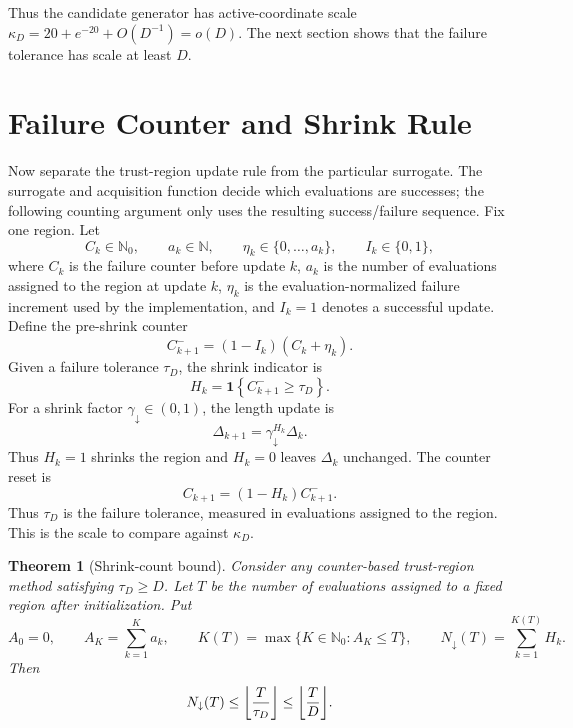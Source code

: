 \documentclass[10pt]{article}
\numberwithin{equation}{section}
\newcommand{\N}{\mathbb{N}}
\newcommand{\indic}[1]{\mathbf{1}\!\left\{#1\right\}}
\DeclarePairedDelimiter{\floor}{\lfloor}{\rfloor}
\theoremstyle{plain}
\newtheorem{theorem}{Theorem}
\theoremstyle{definition}
\theoremstyle{remark}
\begin{document}
Thus the candidate generator has active-coordinate scale
\(\kappa_D=20+e^{-20}+O(D^{-1})=o(D)\).  The next section shows that the
failure tolerance has scale at least \(D\).

\section{Failure Counter and Shrink Rule}

Now separate the trust-region update rule from the particular surrogate.  The
surrogate and acquisition function decide which evaluations are successes; the
following counting argument only uses the resulting success/failure sequence.
Fix one region.  Let
\[
  C_k\in\N_0,
  \qquad
  a_k\in\N,
  \qquad
  \eta_k\in\{0,\ldots,a_k\},
  \qquad
  I_k\in\{0,1\},
\]
where \(C_k\) is the failure counter before update \(k\), \(a_k\) is the number
of evaluations assigned to the region at update \(k\), \(\eta_k\) is the
evaluation-normalized failure increment used by the implementation, and
\(I_k=1\) denotes a successful update.  Define the pre-shrink counter
\begin{equation}
  C_{k+1}^{-}
  =
  (1-I_k)(C_k+\eta_k).
  \label{eq:pre-shrink-counter}
\end{equation}
Given a failure tolerance \(\tau_D\), the shrink indicator is
\begin{equation}
  H_k
  =
  \indic{C_{k+1}^{-}\ge\tau_D}.
  \label{eq:shrink-indicator}
\end{equation}
For a shrink factor \(\gamma_{\downarrow}\in(0,1)\), the length update is
\begin{equation}
  \Delta_{k+1}=\gamma_{\downarrow}^{H_k}\Delta_k .
  \label{eq:shrink-update}
\end{equation}
Thus \(H_k=1\) shrinks the region and \(H_k=0\) leaves \(\Delta_k\) unchanged.
The counter reset is
\begin{equation}
  C_{k+1}=(1-H_k)C_{k+1}^{-}.
  \label{eq:post-shrink-counter}
\end{equation}
Thus \(\tau_D\) is the failure tolerance, measured in evaluations assigned to
the region.  This is the scale to compare against \(\kappa_D\).

\begin{theorem}[Shrink-count bound]
Consider any counter-based trust-region method satisfying
\(\tau_D\ge D\).  Let \(T\) be the number of evaluations assigned to a fixed
region after initialization.  Put
\begin{equation}
  A_0=0,
  \qquad
  A_K=\sum_{k=1}^{K} a_k,
  \qquad
  K(T)=\max\{K\in\N_0:A_K\le T\},
  \qquad
  N_{\downarrow}(T)=\sum_{k=1}^{K(T)}H_k .
  \label{eq:shrink-count}
\end{equation}
Then
\begin{equation}
  N_{\downarrow}(T)
  \le
  \floor*{\frac{T}{\tau_D}}
  \le
  \floor*{\frac{T}{D}} .
  \label{eq:main-bound}
\end{equation}
\end{theorem}
\end{document}

